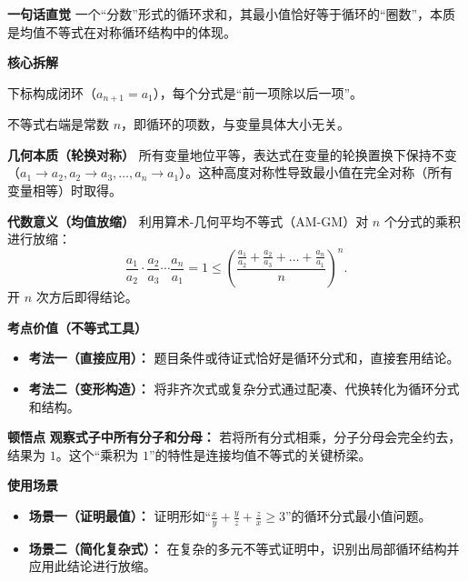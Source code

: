 \begin{explanationbox}
\textbf{\textcolor{CExplanation}{一句话直觉}}
一个“分数”形式的循环求和，其最小值恰好等于循环的“圈数”，本质是均值不等式在对称循环结构中的体现。

\medskip
\textbf{\textcolor{CExplanation}{核心拆解}}
\begin{description}[style=nextline, leftmargin=2.8em, labelsep=0.5em, itemsep=0.45em]
    \item[\textbf{要点一（结构循环）：}] 下标构成闭环（$a_{n+1}=a_1$），每个分式是“前一项除以后一项”。
    \item[\textbf{要点二（目标定值）：}] 不等式右端是常数 $n$，即循环的项数，与变量具体大小无关。
\end{description}

\medskip
\textbf{\textcolor{CExplanation}{几何本质（轮换对称）}}
所有变量地位平等，表达式在变量的轮换置换下保持不变（$a_1 \to a_2, a_2 \to a_3, \dots, a_n \to a_1$）。这种高度对称性导致最小值在完全对称（所有变量相等）时取得。

\medskip
\textbf{\textcolor{CExplanation}{代数意义（均值放缩）}}
利用算术-几何平均不等式（AM-GM）对 $n$ 个分式的乘积进行放缩：
\[
\frac{a_1}{a_2} \cdot \frac{a_2}{a_3} \cdots \frac{a_n}{a_1} = 1 \le \left(\frac{\frac{a_1}{a_2} + \frac{a_2}{a_3} + \dots + \frac{a_n}{a_1}}{n}\right)^n.
\]
开 $n$ 次方后即得结论。

\medskip
\textbf{\textcolor{CExplanation}{考点价值（不等式工具）}}
\begin{itemize}[leftmargin=*, itemsep=0.5em, topsep=0.4em]
    \item \textbf{考法一（直接应用）：} 题目条件或待证式恰好是循环分式和，直接套用结论。
    \item \textbf{考法二（变形构造）：} 将非齐次式或复杂分式通过配凑、代换转化为循环分式和结构。
\end{itemize}

\medskip
\textbf{\textcolor{CExplanation}{顿悟点}}
\textbf{观察式子中所有分子和分母：} 若将所有分式相乘，分子分母会完全约去，结果为 $1$。这个“乘积为 $1$”的特性是连接均值不等式的关键桥梁。

\medskip
\textbf{\textcolor{CExplanation}{使用场景}}
\begin{itemize}[leftmargin=*, itemsep=0.5em, topsep=0.4em]
    \item \textbf{场景一（证明最值）：} 证明形如“$\frac{x}{y}+\frac{y}{z}+\frac{z}{x} \ge 3$”的循环分式最小值问题。
    \item \textbf{场景二（简化复杂式）：} 在复杂的多元不等式证明中，识别出局部循环结构并应用此结论进行放缩。
\end{itemize}
\end{explanationbox}
